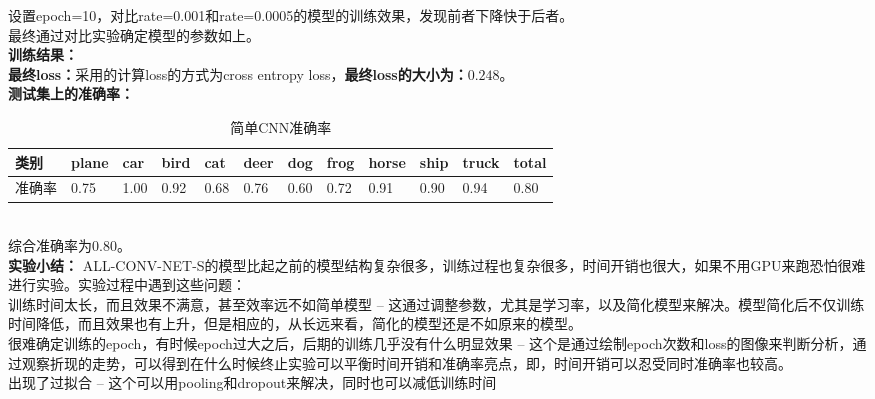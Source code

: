 \documentclass[a4paper,UTF8]{article}
\numberwithin{equation}{section}
\begin{document}
\begin{enumerate}
设置epoch=10，对比rate=0.001和rate=0.0005的模型的训练效果，发现前者下降快于后者。\\
最终通过对比实验确定模型的参数如上。\\
\textbf{训练结果：}\\
\textbf{最终loss：}采用的计算loss的方式为cross entropy loss，\textbf{最终loss的大小为：$0.248$}。\\
\textbf{测试集上的准确率：}
\begin{table}[h]
	\centering
	\caption{简单CNN准确率}
	\label{ac1}
	\begin{tabular}{|l|l|l|l|l|l|l|l|l|l|l|l|}
		\hline
		类别	& plane & car & bird & cat & deer & dog & frog & horse & ship & truck & total \\ \hline
		准确率	& 0.75 & 1.00 & 0.92 & 0.68 & 0.76 & 0.60 & 0.72 & 0.91 & 0.90 & 0.94 & 0.80 \\ \hline
	\end{tabular}
\end{table}\\
综合准确率为$0.80$。\\
\textbf{实验小结：}
ALL-CONV-NET-S的模型比起之前的模型结构复杂很多，训练过程也复杂很多，时间开销也很大，如果不用GPU来跑恐怕很难进行实验。实验过程中遇到这些问题：\\
训练时间太长，而且效果不满意，甚至效率远不如简单模型 -- 这通过调整参数，尤其是学习率，以及简化模型来解决。模型简化后不仅训练时间降低，而且效果也有上升，但是相应的，从长远来看，简化的模型还是不如原来的模型。\\
很难确定训练的epoch，有时候epoch过大之后，后期的训练几乎没有什么明显效果 -- 这个是通过绘制epoch次数和loss的图像来判断分析，通过观察折现的走势，可以得到在什么时候终止实验可以平衡时间开销和准确率亮点，即，时间开销可以忍受同时准确率也较高。\\
出现了过拟合 -- 这个可以用pooling和dropout来解决，同时也可以减低训练时间\\


\end{enumerate}
\end{document}
